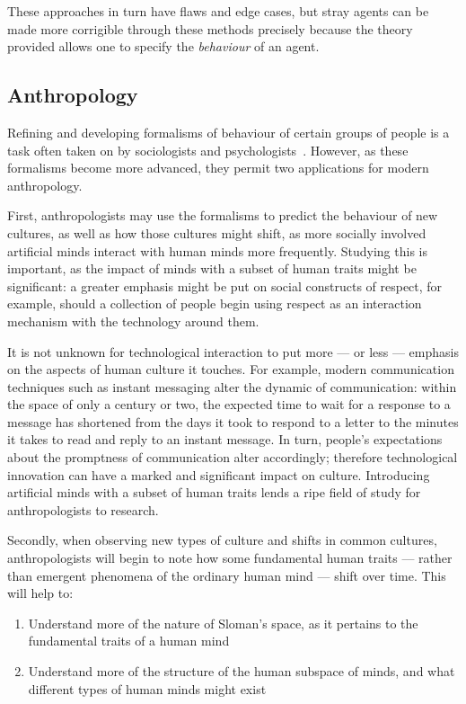 These approaches in turn have flaws and edge cases, but stray agents can be made more corrigible through these methods precisely because the theory provided allows one to specify the \emph{behaviour} of an agent.

\subsection{Anthropology}
Refining and developing formalisms of behaviour of certain groups of people is a task often taken on by sociologists and psychologists~\citep{Gambetta1988, luhmann2000familiarity}. However, as these formalisms become more advanced, they permit two applications for modern anthropology.\par

First, anthropologists may use the formalisms to predict the behaviour of new cultures, as well as how those cultures might shift, as more socially involved artificial minds interact with human minds more frequently. Studying this is important, as the impact of minds with a subset of human traits might be significant: a greater emphasis might be put on social constructs of respect, for example, should a collection of people begin using respect as an interaction mechanism with the technology around them. \par

It is not unknown for technological interaction to put more --- or less --- emphasis on the aspects of human culture it touches. For example, modern communication techniques such as instant messaging alter the dynamic of communication: within the space of only a century or two, the expected time to wait for a response to a message has shortened from the days it took to respond to a letter to the minutes it takes to read and reply to an instant message. In turn, people's expectations about the promptness of communication alter accordingly; therefore technological innovation can have a marked and significant impact on culture. Introducing artificial minds with a subset of human traits lends a ripe field of study for anthropologists to research.\par

Secondly, when observing new types of culture and shifts in common cultures, anthropologists will begin to note how some fundamental human traits --- rather than emergent phenomena of the ordinary human mind --- shift over time. This will help to:

\begin{enumerate}
    \item Understand more of the nature of Sloman's space, as it pertains to the fundamental traits of a human mind
    \item Understand more of the structure of the human subspace of minds, and what different types of human minds might exist
\end{enumerate}

